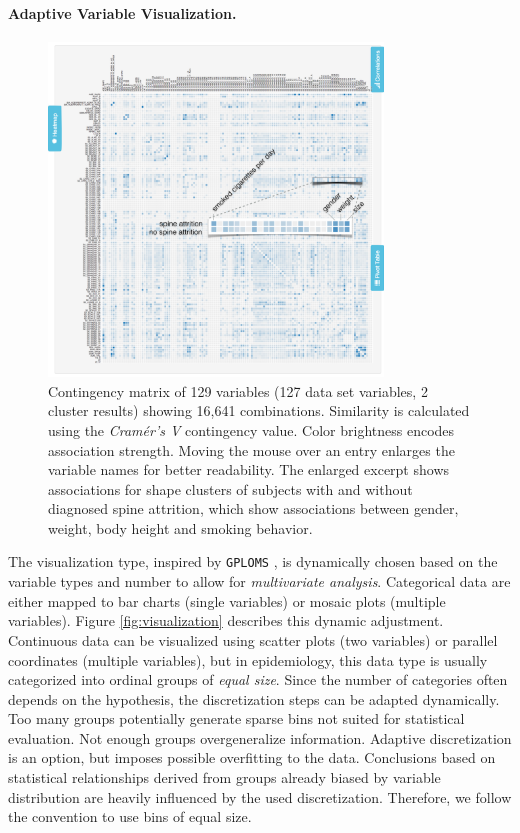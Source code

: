 \documentclass[journal]{style/vgtc} 			          %
\begin{document}
\paragraph{Adaptive Variable Visualization.} \label{sec:AdaptiveFeatureVisualization}
\begin{figure}[htb]
 \centering
 \includegraphics[width=3.5in]{figures/similarity_matrix}
 \caption{Contingency matrix of 129 variables (127 data set variables, 2 cluster results) showing 16,641 combinations.
 Similarity is calculated using the \emph{Cram\'{e}r's V} contingency value.
 Color brightness encodes association strength.
 Moving the mouse over an entry enlarges the variable names for better readability.
 The enlarged excerpt shows associations for shape clusters of subjects with and without diagnosed spine attrition, which show associations between gender, weight, body height and smoking behavior.
 }
 \label{fig:similarity}
\end{figure}
The visualization type, inspired by \texttt{GPLOMS} \cite{GPLOMS, Francois2013}, is dynamically chosen based on the variable types and number to allow for \emph{multivariate analysis}.
%
Categorical data are either mapped to bar charts (single variables) or mosaic plots (multiple variables).
%
Figure \ref{fig:visualization} describes this dynamic adjustment.
%
Continuous data can be visualized using scatter plots (two variables) or parallel coordinates (multiple variables), but in epidemiology, this data type is usually categorized into ordinal groups of \emph{equal size}.
%
Since the number of categories often depends on the hypothesis, the discretization steps can be adapted dynamically.
%
Too many groups potentially generate sparse bins not suited for statistical evaluation.
%
Not enough groups overgeneralize information.
%
Adaptive discretization is an option, but imposes possible overfitting to the data.
%
Conclusions based on statistical relationships derived from groups already biased by variable distribution are heavily influenced by the used discretization.
%
Therefore, we follow the convention to use bins of equal size.
%
\end{document}
